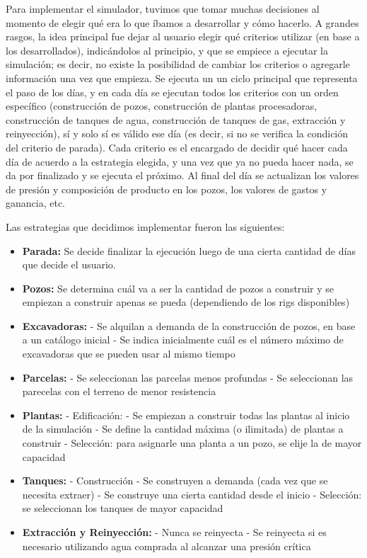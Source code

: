 \par Para implementar el simulador, tuvimos que tomar muchas decisiones al momento de elegir qué era lo que íbamos a desarrollar y cómo hacerlo. A grandes rasgos, la idea principal fue dejar al usuario elegir qué criterios utilizar (en base a los desarrollados), indicándolos al principio, y que se empiece a ejecutar la simulación; es decir, no existe la posibilidad de cambiar los criterios o agregarle información una vez que empieza. Se ejecuta un un ciclo principal que representa el paso de los días, y en cada día se ejecutan todos los criterios con un orden específico (construcción de pozos, construcción de plantas procesadoras, construcción de tanques de agua, construcción de tanques de gas, extracción y reinyección), sí y solo sí es válido ese día (es decir, si no se verifica la condición del criterio de parada). Cada criterio es el encargado de decidir qué hacer cada día de acuerdo a la estrategia elegida, y una vez que ya no pueda hacer nada, se da por finalizado y se ejecuta el próximo. Al final del día se actualizan los valores de presión y composición de producto en los pozos, los valores de gastos y ganancia, etc. 
\par Las estrategias que decidimos implementar fueron las siguientes: 
\begin{itemize}
  \item \textbf{Parada:} Se decide finalizar la ejecución luego de una cierta cantidad de días que decide el usuario. 
  \item \textbf{Pozos:} Se determina cuál va a ser la cantidad de pozos a construir y se empiezan a construir apenas se pueda (dependiendo de los rigs disponibles)
  \item \textbf{Excavadoras:} 
    \subitem - Se alquilan a demanda de la construcción de pozos, en base a un catálogo inicial 
    \subitem - Se indica inicialmente cuál es el número máximo de excavadoras que se pueden usar al mismo tiempo
  \item \textbf{Parcelas:} 
    \subitem - Se seleccionan las parcelas menos profundas
    \subitem - Se seleccionan las parecelas con el terreno de menor resistencia
  \item \textbf{Plantas:}
    \subitem - Edificación: 
        \subsubitem - Se empiezan a construir todas las plantas al inicio de la simulación
        \subsubitem - Se define la cantidad máxima (o ilimitada) de plantas a construir
    \subitem - Selección: para asignarle una planta a un pozo, se elije la de mayor capacidad        
  \item \textbf{Tanques:}
    \subitem - Construcción 
        \subsubitem - Se construyen a demanda (cada vez que se necesita extraer)
        \subsubitem - Se construye una cierta cantidad desde el inicio
    \subitem - Selección: se seleccionan los tanques de mayor capacidad
  \item \textbf{Extracción y Reinyección:}
    \subitem - Nunca se reinyecta
    \subitem - Se reinyecta si es necesario utilizando agua comprada al alcanzar una presión crítica
\end{itemize}





